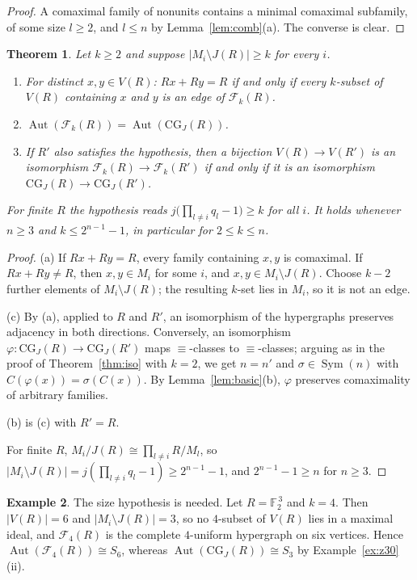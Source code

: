 \documentclass{amsart}
\newtheorem{theorem}{Theorem}[section]
\theoremstyle{definition}
\newtheorem{example}[theorem]{Example}
\theoremstyle{remark}
\newcommand{\Aut}{\operatorname{Aut}}
\newcommand{\Sym}{\operatorname{Sym}}
\newcommand{\CG}{\mathrm{CG}_J}
\begin{document}
\begin{proof}
A comaximal family of nonunits contains a minimal comaximal subfamily, of some size $l\ge2$, and $l\le n$ by Lemma~\ref{lem:comb}(a). The converse is clear.
\end{proof}

\begin{theorem}\label{thm:full}
Let $k\ge2$ and suppose $|M_i\setminus J(R)|\ge k$ for every $i$.
\begin{enumerate}
\item[(a)] For distinct $x,y\in V(R)$: $Rx+Ry=R$ if and only if every $k$-subset of $V(R)$ containing $x$ and $y$ is an edge of $\mathcal F_k(R)$.
\item[(b)] $\Aut(\mathcal F_k(R))=\Aut(\CG(R))$.
\item[(c)] If $R'$ also satisfies the hypothesis, then a bijection $V(R)\to V(R')$ is an isomorphism $\mathcal F_k(R)\to\mathcal F_k(R')$ if and only if it is an isomorphism $\CG(R)\to\CG(R')$.
\end{enumerate}
For finite $R$ the hypothesis reads $j\bigl(\prod_{l\ne i}q_l-1\bigr)\ge k$ for all $i$. It holds whenever $n\ge3$ and $k\le 2^{n-1}-1$, in particular for $2\le k\le n$.
\end{theorem}

\begin{proof}
(a) If $Rx+Ry=R$, every family containing $x,y$ is comaximal. If $Rx+Ry\ne R$, then $x,y\in M_i$ for some $i$, and $x,y\in M_i\setminus J(R)$. Choose $k-2$ further elements of $M_i\setminus J(R)$; the resulting $k$-set lies in $M_i$, so it is not an edge.

(c) By (a), applied to $R$ and $R'$, an isomorphism of the hypergraphs preserves adjacency in both directions. Conversely, an isomorphism $\varphi\colon\CG(R)\to\CG(R')$ maps $\equiv$-classes to $\equiv$-classes; arguing as in the proof of Theorem~\ref{thm:iso} with $k=2$, we get $n=n'$ and $\sigma\in\Sym(n)$ with $C(\varphi(x))=\sigma(C(x))$. By Lemma~\ref{lem:basic}(b), $\varphi$ preserves comaximality of arbitrary families.

(b) is (c) with $R'=R$.

For finite $R$, $M_i/J(R)\cong\prod_{l\ne i}R/M_l$, so $|M_i\setminus J(R)|=j(\prod_{l\ne i}q_l-1)\ge 2^{n-1}-1$, and $2^{n-1}-1\ge n$ for $n\ge3$.
\end{proof}

\begin{example}
The size hypothesis is needed. Let $R=\mathbb F_2^{\,3}$ and $k=4$. Then $|V(R)|=6$ and $|M_i\setminus J(R)|=3$, so no $4$-subset of $V(R)$ lies in a maximal ideal, and $\mathcal F_4(R)$ is the complete $4$-uniform hypergraph on six vertices. Hence $\Aut(\mathcal F_4(R))\cong S_6$, whereas $\Aut(\CG(R))\cong S_3$ by Example~\ref{ex:z30}(ii).
\end{example}
\end{document}
